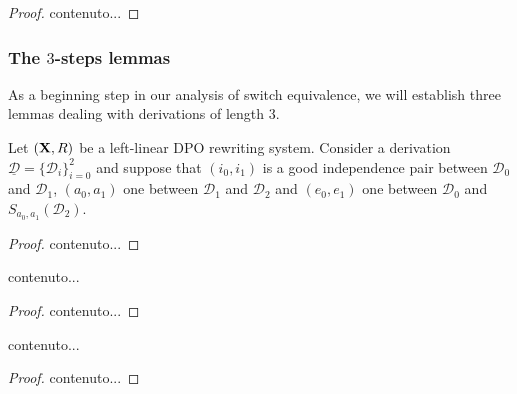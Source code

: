 \documentclass[a4paper,UKenglish,cleveref,pdftex, thm-restate,numberwithinsect]{lipics}
\def\R{\mathsf{R}}
\def\X{\textbf {\textup{X}}}
\newcommand{\dder}[1]{\mathscr{#1}}
\newcommand{\der}[1]{\underline{\dder{#1}}}
\begin{document}
\begin{definition}
\end{definition}
\begin{lemma}
\end{lemma}
\begin{proof}
	contenuto...
\end{proof}



\subsubsection{The $3$-steps lemmas} 

As a beginning step in our analysis of switch equivalence, we will establish three lemmas  dealing with derivations of length $3$. 


\begin{lemma}\label{lem:primo}
	Let $(\X,\R)$ be a left-linear DPO rewriting system. Consider a derivation $\der{D}=\{\dder{D}_i\}_{i=0}^2$ and suppose that $(i_0,i_1)$ is a good independence pair between $\dder{D}_0$ and $\dder{D}_1$, $(a_0,a_1)$ one between $\dder{D}_1$ and $\dder{D}_2$ and $(e_0, e_1)$ one between $\dder{D}_0$ and $S_{a_0,a_1}(\dder{D}_2)$.
\end{lemma}
\begin{proof}
	contenuto...
\end{proof}


\begin{lemma}\label{lem:secondo}
	contenuto...
\end{lemma}
\begin{proof}
	contenuto...
\end{proof}



\begin{lemma}\label{lem:terzo}
	contenuto...
\end{lemma}
\begin{proof}
	contenuto...
\end{proof}
\end{document}
